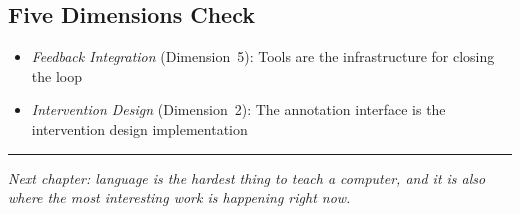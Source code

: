 \subsection*{Five Dimensions Check}

\begin{itemize}
  \item \textit{Feedback Integration} (Dimension~5): Tools are the infrastructure for closing the loop
  \item \textit{Intervention Design} (Dimension~2): The annotation interface is the intervention design implementation
\end{itemize}

\bigskip
\begin{center}
\rule{0.5\textwidth}{0.4pt}
\end{center}
\bigskip

\noindent\textit{Next chapter: language is the hardest thing to teach a computer, and it is also where the most interesting \hitl work is happening right now.}
